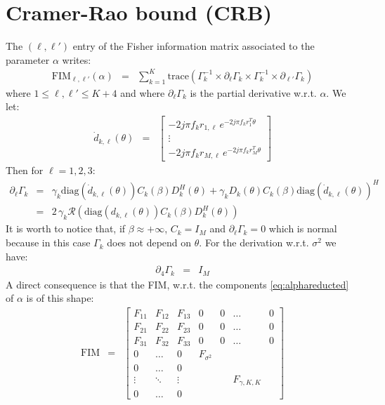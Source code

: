 \documentclass[a4paper, 12pt]{report}
\newcommand{\diag}[1]{\mathrm{diag}\left( #1 \right)}
\newcommand{\trace}[1]{\mathrm{trace}\left( #1 \right)}
\def\fim{\mathrm{FIM}}
\begin{document}
 \section{Cramer-Rao bound (CRB)}
The $(\ell,\ell')$ entry of the Fisher information matrix  associated to the parameter $\alpha$ writes:
\begin{eqnarray}
 \label{eq:FIM}
\fim_{\ell,\ell'}(\alpha)&=&\sum_{k=1}^{K}\trace{\Gamma_{k}^{-1}\times\partial_{\ell}\Gamma_{k}\times\Gamma_{k}^{-1}\times\partial_{\ell'}\Gamma_{k}}
\end{eqnarray}
where $1\leq \ell,\ell'\leq K+4$ and where $\partial_{\ell}\Gamma_{k}$ is the partial derivative w.r.t. $\alpha$.   We let:
\begin{eqnarray*}
 \dot d_{k,\ell}(\theta)&=&
  \begin{bmatrix}
  -2j\pi f_{k} r_{1,\ell}\,e^{-2j\pi f_{k}r_{1}^{T}\theta}
  \\
  \vdots
  \\
  -2j\pi f_{k} r_{M,\ell}\,e^{-2j\pi f_{k}r_{M}^{T}\theta}
  \end{bmatrix}
\end{eqnarray*}
Then for $\ell=1,2,3$:
\begin{eqnarray*}
\partial_{\ell}\Gamma_{k}&=&
   \gamma_{k}\diag{ \dot d_{k,\ell}(\theta)}C_{k}(\beta)D_{k}^{H}(\theta)+
   \gamma_{k} D_{k}(\theta)C_{k}(\beta) \diag{ \dot d_{k,\ell}(\theta)}^{H}
   \\
   &=&2\, \gamma_{k} \mathcal{R}\left(
   \diag{d_{k,\ell}(\theta)}C_{k}(\beta)D_{k}^{H}(\theta)\right)
\end{eqnarray*}
It is worth to notice that, if $\beta\approx +\infty$, $C_{k}=I_{M}$ and $\partial_{\ell}\Gamma_{k}=0$ which is normal because in this case $\Gamma_{k}$ does not depend on $\theta$. For the derivation w.r.t. $\sigma^{2}$ we have:
\begin{eqnarray*}
\partial_{4}\Gamma_{k}&=&I_{M}
\end{eqnarray*}
A direct consequence is that the FIM, w.r.t. the components \eqref{eq:alphareducted} of $\alpha$ is of this shape:
\begin{eqnarray*}
 \fim&=&\begin{bmatrix}
 F_{11}&F_{12}&F_{13}&0&0&\ldots&0
 \\
 F_{21}&F_{22}&F_{23}&0&0&\ldots&0
 \\
F_{31}&F_{32}&F_{33}&0&0&\ldots&0
 \\
0&\ldots&0&F_{\sigma^{2}}&
 \\
0&\ldots&0&&
\\
\vdots&\ddots&\vdots&&&F_{\gamma,K,K}
\\
0&\ldots&0
 \end{bmatrix}
\end{eqnarray*}
\end{document}

